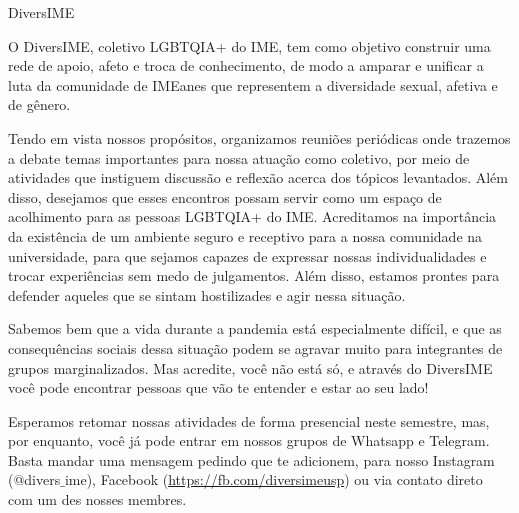 \begin{subsecao}{DiversIME}


O DiversIME, coletivo LGBTQIA+ do IME, tem como objetivo construir uma rede de
apoio, afeto e troca de conhecimento, de modo a amparar e unificar a luta da
comunidade de IMEanes que representem a diversidade sexual, afetiva e de gênero. 

Tendo em vista nossos propósitos, organizamos reuniões periódicas onde trazemos
a debate temas importantes para nossa atuação como coletivo, por meio de
atividades que instiguem discussão e reflexão acerca dos tópicos levantados.
Além disso, desejamos que esses encontros possam servir como um espaço de
acolhimento para as pessoas LGBTQIA+ do IME. Acreditamos na importância da
existência de um ambiente seguro e receptivo para a nossa comunidade na
universidade, para que sejamos capazes de expressar nossas individualidades
e trocar experiências sem medo de julgamentos. Além disso, estamos prontes
para defender aqueles que se sintam hostilizades e agir nessa situação. 

Sabemos bem que a vida durante a pandemia está especialmente difícil, e que %
as consequências sociais dessa situação podem se agravar muito para integrantes
de grupos marginalizados. Mas acredite, você não está só, e através do DiversIME
você pode encontrar pessoas que vão te entender e estar ao seu lado!

Esperamos retomar nossas atividades de forma presencial neste semestre, mas, %
por enquanto, você já pode entrar em nossos grupos de Whatsapp e Telegram.
Basta mandar uma mensagem pedindo que te adicionem, para nosso Instagram
(@divers$\_$ime), Facebook (\url{https://fb.com/diversimeusp}) ou via contato direto
com um des nosses membres.

\end{subsecao}
